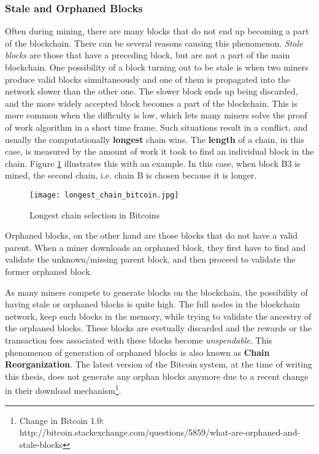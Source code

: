 \documentclass[english]{tktltiki}
\begin{document}
\subsubsection{Stale and Orphaned Blocks} \label{stale blocks}

Often during mining, there are many blocks that do not end up becoming a part of the blockchain. There can be several reasons causing this phenomenon. \textit{Stale blocks} are those that have a preceding block, but are not a part of the main blockchain. One possibility of a block turning out to be stale is when two miners produce valid blocks simultaneously and one of them is propagated into the network slower than the other one. The slower block ends up being discarded, and the more widely accepted block becomes a part of the blockchain. This is more common when the difficulty is low, which lets many miners solve the proof of work algorithm in a short time frame. Such situations result in a conflict, and usually the computationally \textbf{longest} chain wins. The \textbf{length} of a chain, in this case, is measured by the amount of work it took to find an individual block in the chain. Figure \ref{longest_chain} illustrates this with an example. In this case, when block B3 is mined, the second chain, i.e. chain B is chosen because it is longer.\newline

\begin{figure}[H]
\begin{center}
\texttt{[image: longest\_chain\_bitcoin.jpg]}
\caption{Longest chain selection in Bitcoins}
\label{longest_chain}
\end{center}
\end{figure}

Orphaned blocks, on the other hand are those blocks that do not have a valid parent. When a miner downloads an orphaned block, they first have to find and validate the unknown/missing parent block, and then proceed to validate the former orphaned block. 

As many miners compete to generate blocks on the blockchain, the possibility of having stale or orphaned blocks is quite high. The full nodes in the blockchain network, keep such blocks in the memory, while trying to validate the ancestry of the orphaned blocks. These blocks are evetually discarded and the rewards or the transaction fees associated with these blocks become \textit{unspendable}. This phenomenon of generation of orphaned blocks is also known as \textbf{Chain Reorganization}. The latest version of the Bitcoin system, at the time of writing this thesis, does not generate any orphan blocks anymore due to a recent change in their download mechanism\footnote{Change in Bitcoin 1.0: http://bitcoin.stackexchange.com/questions/5859/what-are-orphaned-and-stale-blocks}.
\end{document}
